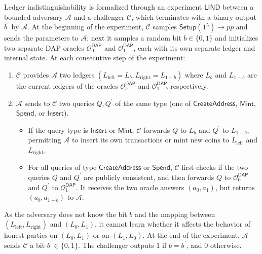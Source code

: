 \documentclass{llncs}
\newcommand{\func}[1]{\mathsf{#1}}
\newcommand{\oracle}{\mathcal{O}^{\func{DAP}}}
\begin{document}
Ledger indistinguishability is formalized through an experiment $\func{LIND}$ between a bounded adversary $\mathcal{A}$ and a challenger $\mathcal{C}$, which terminates with a binary output $b^{\prime}$ by $\mathcal{A}$.
At the beginning of the experiment, $\mathcal{C}$ samples $\func{Setup}(1^\lambda) \to pp$ and sends the parameters to $\mathcal{A}$; next it samples a random bit $b \in \lbrace 0,1 \rbrace$ and initializes two separate DAP oracles $\oracle_0$ and $\oracle_1$, each with its own separate ledger and internal state.
At each consecutive step of the experiment:
\begin{enumerate}
\item $\mathcal{C}$ provides $\mathcal{A}$ two ledgers $(L_{\text{left}} = L_b, L_{\text{right}} = L_{1-b})$ where $L_b$ and $L_{1-b}$ are the current ledgers of the oracles $\oracle_b$ and $\oracle_{1-b}$ respectively. 
\item $\mathcal{A}$ sends to $\mathcal{C}$ two queries $Q, Q^{\prime}$ of the same type (one of $\func{CreateAddress}$, $\func{Mint}$, $\func{Spend}$, or $\func{Insert}$). 
\begin{itemize}
    \item If the query type is $\func{Insert}$ or $\func{Mint}$, $\mathcal{C}$ forwards $Q$ to $L_{b}$ and $Q^\prime$ to $L_{1-b}$, permitting $\mathcal{A}$ to insert its own transactions or mint new coins to $L_{\text{left}}$ and $L_{\text{right}}$.
    \item For all queries of type $\func{CreateAddress}$ or $\func{Spend}$, $\mathcal{C}$ first checks if the two queries $Q$ and $Q^\prime$ are publicly consistent, and then forwards $Q$ to $\oracle_0$ and $Q^\prime$ to $\oracle_1$.
    It receives the two oracle answers $(a_0,a_1)$, but returns $(a_b,a_{1-b})$ to $\mathcal{A}$.
\end{itemize}
\end{enumerate}
As the adversary does not know the bit $b$ and the mapping between $(L_{\text{left}}, L_{\text{right}})$ and $(L_0, L_1)$, it cannot learn whether it affects the behavior of honest parties on $(L_0, L_1)$ or on $(L_1, L_0)$.
At the end of the experiment, $\mathcal{A}$ sends $\mathcal{C}$ a bit $b^\prime \in \lbrace 0,1 \rbrace$.
The challenger outputs 1 if $b = b^\prime$, and 0 otherwise.
\end{document}
